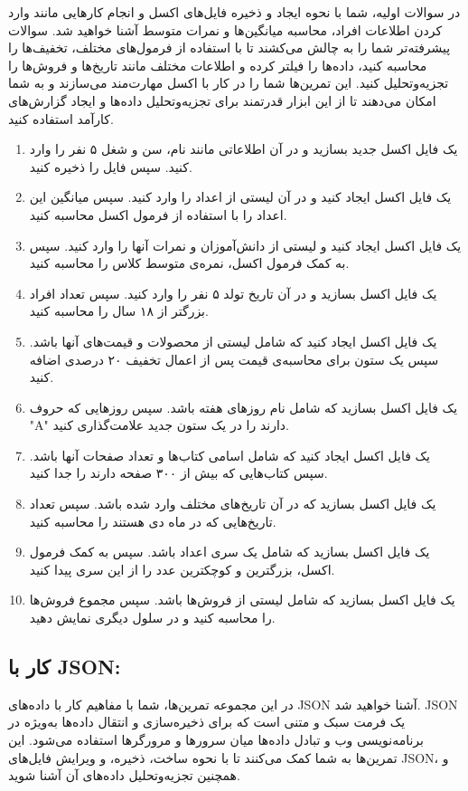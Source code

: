 \documentclass[b5paper,12pt]{article}
\begin{document}
	در سوالات اولیه، شما با نحوه ایجاد و ذخیره فایل‌های اکسل و انجام کارهایی مانند وارد کردن اطلاعات افراد، محاسبه میانگین‌ها و نمرات متوسط آشنا خواهید شد. سوالات پیشرفته‌تر شما را به چالش می‌کشند تا با استفاده از فرمول‌های مختلف، تخفیف‌ها را محاسبه کنید، داده‌ها را فیلتر کرده و اطلاعات مختلف مانند تاریخ‌ها و فروش‌ها را تجزیه‌وتحلیل کنید. این تمرین‌ها شما را در کار با اکسل مهارت‌مند می‌سازند و به شما امکان می‌دهند تا از این ابزار قدرتمند برای تجزیه‌وتحلیل داده‌ها و ایجاد گزارش‌های کارآمد استفاده کنید.
	
	\begin{enumerate}
		\item یک فایل اکسل جدید بسازید و در آن اطلاعاتی مانند نام، سن و شغل ۵ نفر را وارد کنید. سپس فایل را ذخیره کنید.
		\item یک فایل اکسل ایجاد کنید و در آن لیستی از اعداد را وارد کنید. سپس میانگین این اعداد را با استفاده از فرمول اکسل محاسبه کنید.
		\item یک فایل اکسل ایجاد کنید و لیستی از دانش‌آموزان و نمرات آنها را وارد کنید. سپس به کمک فرمول اکسل، نمره‌ی متوسط کلاس را محاسبه کنید.
		\item یک فایل اکسل بسازید و در آن تاریخ تولد ۵ نفر را وارد کنید. سپس تعداد افراد بزرگتر از ۱۸ سال را محاسبه کنید.
		\item یک فایل اکسل ایجاد کنید که شامل لیستی از محصولات و قیمت‌های آنها باشد. سپس یک ستون برای محاسبه‌ی قیمت پس از اعمال تخفیف ۲۰ درصدی اضافه کنید.
		\item یک فایل اکسل بسازید که شامل نام روزهای هفته باشد. سپس روزهایی که حروف "A" دارند را در یک ستون جدید علامت‌گذاری کنید.
		\item یک فایل اکسل ایجاد کنید که شامل اسامی کتاب‌ها و تعداد صفحات آنها باشد. سپس کتاب‌هایی که بیش از ۳۰۰ صفحه دارند را جدا کنید.
		\item یک فایل اکسل بسازید که در آن تاریخ‌های مختلف وارد شده باشد. سپس تعداد تاریخ‌هایی که در ماه دی هستند را محاسبه کنید.
		\item یک فایل اکسل بسازید که شامل یک سری اعداد باشد. سپس به کمک فرمول اکسل، بزرگترین و کوچکترین عدد را از این سری پیدا کنید.
		\item یک فایل اکسل بسازید که شامل لیستی از فروش‌ها باشد. سپس مجموع فروش‌ها را محاسبه کنید و در سلول دیگری نمایش دهید.
	\end{enumerate}
	
	\subsection*{کار با JSON:}
	در این مجموعه تمرین‌ها، شما با مفاهیم کار با داده‌های JSON آشنا خواهید شد. JSON یک فرمت سبک و متنی است که برای ذخیره‌سازی و انتقال داده‌ها به‌ویژه در برنامه‌نویسی وب و تبادل داده‌ها میان سرورها و مرورگرها استفاده می‌شود. این تمرین‌ها به شما کمک می‌کنند تا با نحوه ساخت، ذخیره، و ویرایش فایل‌های JSON، و همچنین تجزیه‌وتحلیل داده‌های آن آشنا شوید.
\end{document}
